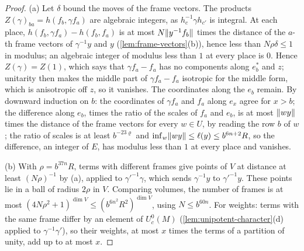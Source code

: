 \begin{proof}
(a) Let $\delta$ bound the moves of the frame vectors. The products $Z(\gamma)_{ba}=h(f_b,\gamma f_a)$ are algebraic integers, as $h_c^{-1}\gamma h_{c'}$ is integral. At each place, $h(f_b,\gamma f_a)-h(f_b,f_a)$ is at most $N\lVert y^{-1}f_b\rVert$ times the distance of the $a$-th frame vectors
of $\gamma^{-1}y$ and $y$ (\cref{lem:frame-vectors}(b)), hence less than $N\rho\delta\le1$ in modulus; an algebraic integer of modulus less than $1$ at every place is $0$. Hence $Z(\gamma)=Z(1)$, which says that $\gamma f_a-f_a$ has no components along $e^*_b$
and $z$; unitarity then makes the middle part of $\gamma f_a-f_a$ isotropic for the middle form, which is anisotropic off $z$, so it vanishes. The coordinates along the $e_b$ remain. By downward induction on $b$: the coordinates of $\gamma f_a$ and
$f_a$ along $e_x$ agree for $x>b$; the difference along $e_b$, times the ratio of the scales of $f_a$ and $e_b$, is at most $\lVert wy\rVert$ times the distance of the frame vectors for every $w\in U$, by reading the row $b$ of $w$; the ratio of scales is at least
$b^{-23\varrho}$ and $\inf_w\lVert wy\rVert\le\ell(y)\le b^{6n+2}R$, so the difference, an integer of $E$, has modulus less than $1$ at every place and vanishes.

(b) With $\rho=b^{37n}R$, terms with different frames give points of $V$ at distance at least $(N\rho)^{-1}$ by (a), applied to $\gamma'^{-1}\gamma$, which sends $\gamma^{-1}y$ to $\gamma'^{-1}y$. These points lie in a ball of radius $2\rho$ in $V$. Comparing volumes,
the number of frames is at most $(4N\rho^2+1)^{\dim V}\le(b^{6n^2}R^2)^{\dim V}$, using $N\le b^{60n}$. For weights: terms with the same frame differ by an element of $U^0_c(M)$ (\cref{lem:unipotent-character}(d) applied to $\gamma^{-1}\gamma'$), so their weights,
at most $x$ times the terms of a partition of unity, add up to at most $x$.


\end{proof}
